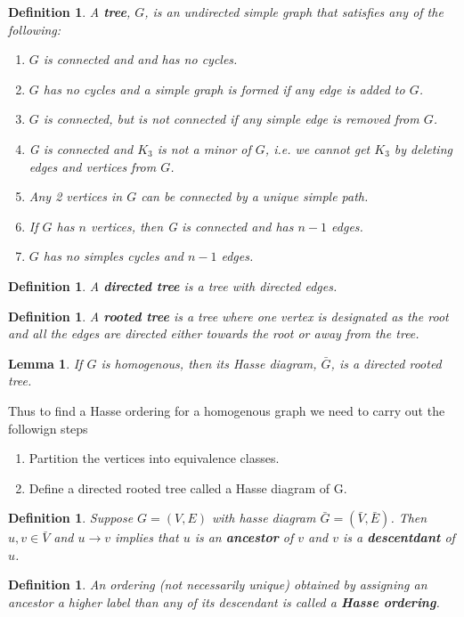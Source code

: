 \documentclass[12pt, leqno]{article}
\newtheorem{lemma}{Lemma}[]
\newtheorem{defn}[thm]{Definition}
\begin{document}
\begin{defn}
A \textbf{tree}, $G$, is an undirected simple graph that satisfies any of the
following:
\begin{enumerate}
\item $G$ is connected and and has no cycles.
\item $G$ has no cycles and a simple graph is formed if any edge is
  added to $G$.
\item $G$ is connected, but is not connected if any simple edge is
  removed from $G$.
\item G is connected and $K_3$ is not a minor of $G$, i.e. we cannot
  get $K_3$ by deleting edges and vertices from $G$.
\item Any 2 vertices in $G$ can be connected by a unique simple path.
\item If $G$ has $n$ vertices, then G is connected and has $n-1$
  edges.
\item $G$ has no simples cycles and $n-1$ edges.
\end{enumerate}
\end{defn}
\begin{defn}
A \textbf{directed tree} is a tree with directed edges.
\end{defn}
\begin{defn}
A \textbf{rooted tree} is a tree where one vertex is designated as the
root and all the edges are directed either towards the root or away
from the tree.
\end{defn}
\begin{lemma}
If $G$ is homogenous, then its Hasse diagram, $\bar{G}$, is a directed
rooted tree.
\end{lemma}
Thus to find a Hasse ordering for a homogenous graph we need to carry
out the followign steps
\begin{enumerate}
\item Partition the vertices into equivalence classes.
\item Define a directed rooted tree called a Hasse diagram of G.
\end{enumerate}
\begin{defn}
Suppose $G = (V,E)$ with hasse diagram $\bar{G} =
(\bar{V},\bar{E})$. Then $u,v \in \bar{V}$ and $u \to v$ implies
that $u$ is an \textbf{ancestor} of $v$ and $v$ is a
\textbf{descentdant} of $u$.
\end{defn}
\begin{defn}
An ordering (not necessarily unique) obtained by assigning an ancestor
a higher label than any of its descendant is called a \textbf{Hasse ordering}.
\end{defn}
\end{document}
